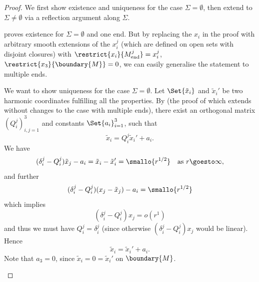 \documentclass[titlepage,numbers=noenddot,headinclude,oneside,%
footinclude=true,cleardoublepage=empty,%
BCOR=5mm,paper=a4,fontsize=11pt,%
english,%
]{scrartcl}
\newcommand{\Mend}{M_{\mathrm{end}}} %
\begin{document}
\begin{proof}
    We first show existence and uniqueness for the case \( \Sigma=\emptyset \), then extend to \( \Sigma\neq \emptyset \) via a reflection argument along \( \Sigma \).
 
    \begin{proofenumerate}[label=\textbf{Step \arabic*.}]
        \item \cite[Proposition 3.8]{almarazPositiveMassTheorem2016} proves existence for \( \Sigma=\emptyset \) and one end. But by replacing the \( x_i \) in the proof with arbitrary smooth extensions of the \( x_i^j \) (which are defined on open sets with disjoint closures) with \( \restrict{x_i}{\Mend^j}=x_i^j  \), \( \restrict{x_3}{\boundary{M}}=0 \), we can easily generalise the statement to multiple ends.


        
        We want to show uniqueness for the case \( \Sigma=\emptyset \). Let \( \Set{\tilde{x}_i} \) and \( \tilde{x}_i' \) be two harmonic coordinates fulfilling all the properties. By \cite[Proposition 3.9]{almarazPositiveMassTheorem2016} (the proof of which extends without changes to the case with multiple ends), there exist an orthogonal matrix \( (Q_{i}^j)_{i,j=1}^3 \) and constants \( \Set{a_i}_{i=1}^3 \), such that
        \begin{equation*}
            \tilde{x}_i=Q_i^j\tilde{x}_i'+a_i.
        \end{equation*}
        We have
        \begin{equation*}
            (\delta_i^j-Q_i^j)\tilde{x}_j-a_i=\tilde{x}_i-\tilde{x}_i'=\smallo{r^{1/2}} \quad \text{as \( r\goesto \infty \)},
        \end{equation*}
        and further
        \begin{equation*}
            (\delta_i^j-Q_i^j)(x_j-\tilde{x}_j)-a_i=\smallo{r^{1/2}}
        \end{equation*}
        which implies 
        \begin{equation*}
            (\delta_i^j-Q_i^j)x_j=o(r^1)
        \end{equation*}
        and thus we must have \( Q_i^j=\delta_i^j \) (since otherwise \( (\delta_i^j-Q_i^j)x_j \) would be linear). Hence
        \begin{equation*}
            \tilde{x}_i=\tilde{x}_i'+a_i.
        \end{equation*} 
        Note that \( a_3=0 \), since \( \tilde{x}_i=0=\tilde{x}_i' \) on \( \boundary{M} \).


\end{proofenumerate}
\end{proof}
\end{document}
